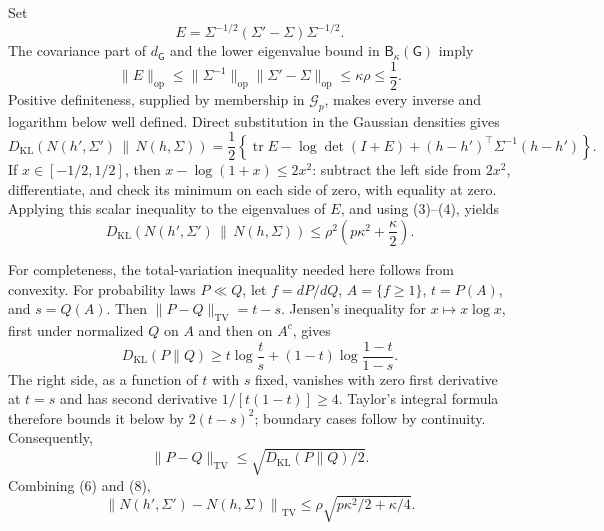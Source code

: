 Set
\[
 E=\Sigma^{-1/2}(\Sigma'-\Sigma)\Sigma^{-1/2}.
\]
The covariance part of \(d_{\mathsf G}\) and the lower eigenvalue bound in \(\mathsf B_{\kappa}(\mathsf G)\) imply
\[
 \lVert E\rVert_{\mathrm{op}}
 \leq\lVert\Sigma^{-1}\rVert_{\mathrm{op}}
       \lVert\Sigma'-\Sigma\rVert_{\mathrm{op}}
 \leq\kappa\rho\leq\frac12. \tag{4}
\]
Positive definiteness, supplied by membership in \(\mathcal G_p\), makes every inverse and logarithm below well defined. Direct substitution in the Gaussian densities gives
\[
 D_{\mathrm{KL}}\!\left(N(h',\Sigma')\,\middle\|\,N(h,\Sigma)\right)
 =\frac12\left\{
 \operatorname{tr}E-\log\det(I+E)
 +(h-h')^{\top}\Sigma^{-1}(h-h')
 \right\}. \tag{5}
\]
If \(x\in[-1/2,1/2]\), then \(x-\log(1+x)\leq2x^2\): subtract the left side from \(2x^2\), differentiate, and check its minimum on each side of zero, with equality at zero. Applying this scalar inequality to the eigenvalues of \(E\), and using (3)--(4), yields
\[
 D_{\mathrm{KL}}\!\left(N(h',\Sigma')\,\middle\|\,N(h,\Sigma)\right)
 \leq \rho^2\left(p\kappa^2+\frac{\kappa}{2}\right). \tag{6}
\]

For completeness, the total-variation inequality needed here follows from convexity. For probability laws \(P\ll Q\), let \(f=dP/dQ\), \(A=\{f\geq1\}\), \(t=P(A)\), and \(s=Q(A)\). Then \(\lVert P-Q\rVert_{\mathrm{TV}}=t-s\). Jensen's inequality for \(x\mapsto x\log x\), first under normalized \(Q\) on \(A\) and then on \(A^c\), gives
\[
 D_{\mathrm{KL}}(P\|Q)
 \geq t\log\frac ts+(1-t)\log\frac{1-t}{1-s}. \tag{7}
\]
The right side, as a function of \(t\) with \(s\) fixed, vanishes with zero first derivative at \(t=s\) and has second derivative \(1/[t(1-t)]\geq4\). Taylor's integral formula therefore bounds it below by \(2(t-s)^2\); boundary cases follow by continuity. Consequently,
\[
 \lVert P-Q\rVert_{\mathrm{TV}}
 \leq\sqrt{D_{\mathrm{KL}}(P\|Q)/2}. \tag{8}
\]
Combining (6) and (8),
\[
 \left\lVert N(h',\Sigma')-N(h,\Sigma)\right\rVert_{\mathrm{TV}}
 \leq\rho\sqrt{p\kappa^2/2+\kappa/4}. \tag{9}
\]

